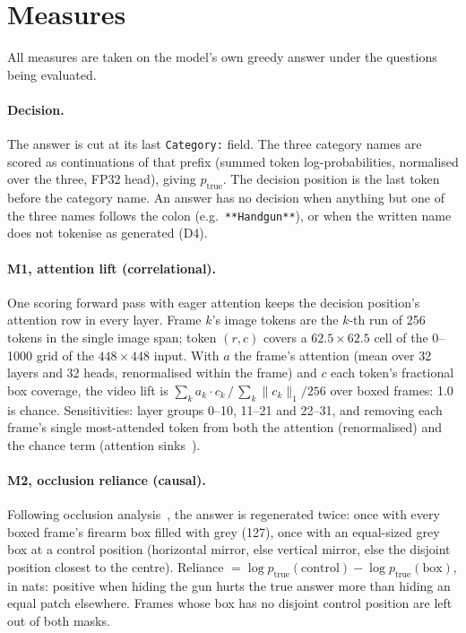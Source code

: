 \documentclass[11pt]{article}
\begin{document}
\section{Measures}
All measures are taken on the model's own greedy answer under the questions being evaluated.

\paragraph{Decision.} The answer is cut at its last \texttt{Category:} field. The three category names are scored as continuations of that prefix (summed token log-probabilities, normalised over the three, FP32 head), giving $p_\text{true}$. The decision position is the last token before the category name. An answer has no decision when anything but one of the three names follows the colon (e.g.\ \texttt{**Handgun**}), or when the written name does not tokenise as generated (D4).

\paragraph{M1, attention lift (correlational).} One scoring forward pass with eager attention keeps the decision position's attention row in every layer. Frame $k$'s image tokens are the $k$-th run of 256 tokens in the single image span; token $(r,c)$ covers a $62.5\times62.5$ cell of the 0--1000 grid of the $448\times448$ input. With $a$ the frame's attention (mean over 32 layers and 32 heads, renormalised within the frame) and $c$ each token's fractional box coverage, the video lift is $\sum_k a_k\!\cdot\!c_k \,/\, \sum_k \lVert c_k\rVert_1/256$ over boxed frames: 1.0 is chance. Sensitivities: layer groups 0--10, 11--21 and 22--31, and removing each frame's single most-attended token from both the attention (renormalised) and the chance term (attention sinks~\cite{xiao2024sinks,darcet2024registers}).

\paragraph{M2, occlusion reliance (causal).} Following occlusion analysis~\cite{zeiler2014visualizing}, the answer is regenerated twice: once with every boxed frame's firearm box filled with grey (127), once with an equal-sized grey box at a control position (horizontal mirror, else vertical mirror, else the disjoint position closest to the centre). Reliance $=\log p_\text{true}(\text{control}) - \log p_\text{true}(\text{box})$, in nats: positive when hiding the gun hurts the true answer more than hiding an equal patch elsewhere. Frames whose box has no disjoint control position are left out of both masks.
\end{document}
